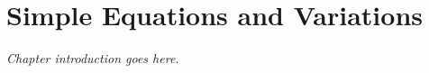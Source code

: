 \chapter{Simple Equations and Variations}

\textit{Chapter introduction goes here.}

\vspace{1cm}






